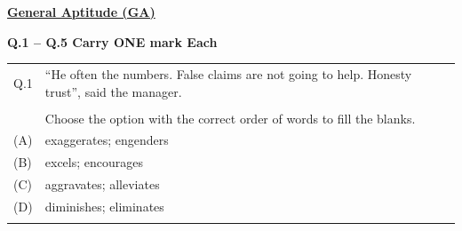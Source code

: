 \documentclass[12pt,a4paper]{article}
\begin{document}
\begin{center}
    \textbf{\underline{General Aptitude (GA)}}
\end{center}

\textbf{Q.1 -- Q.5 Carry ONE mark Each}

\vspace{0.5em}

\begin{tabular}{|p{1cm}|p{12cm}|}
\hline
Q.1 & ``He often \underline{\hspace{1.5cm}} the numbers. False claims are not going to help. Honesty \underline{\hspace{1.5cm}} trust'', said the manager. \\
    & \\
    & Choose the option with the correct order of words to fill the blanks. \\
\hline
(A) & exaggerates; engenders \\
\hline
(B) & excels; encourages \\
\hline
(C) & aggravates; alleviates \\
\hline
(D) & diminishes; eliminates \\
\hline
& \rule{0pt}{8cm} \\
\hline
\end{tabular}

\newpage
\end{document}
